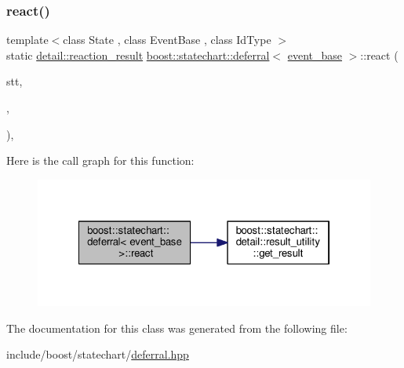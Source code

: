\subsubsection{\texorpdfstring{react()}{react()}}
{\footnotesize\ttfamily template$<$class State , class Event\+Base , class Id\+Type $>$ \\
static \mbox{\hyperlink{namespaceboost_1_1statechart_1_1detail_ab091bbb4c29327fb46ee479ea1b7255b}{detail\+::reaction\+\_\+result}} \mbox{\hyperlink{classboost_1_1statechart_1_1deferral}{boost\+::statechart\+::deferral}}$<$ \mbox{\hyperlink{classboost_1_1statechart_1_1event__base}{event\+\_\+base}} $>$\+::react (\begin{DoxyParamCaption}\item[{State \&}]{stt,  }\item[{const Event\+Base \&}]{,  }\item[{const Id\+Type \&}]{ }\end{DoxyParamCaption})\hspace{0.3cm}{\ttfamily [inline]}, {\ttfamily [static]}}

Here is the call graph for this function\+:
\nopagebreak
\begin{figure}[H]
\begin{center}
\leavevmode
\includegraphics[width=322pt]{classboost_1_1statechart_1_1deferral_3_01event__base_01_4_abce5ad466565afb17f0a210b651635bf_cgraph}
\end{center}
\end{figure}


The documentation for this class was generated from the following file\+:\begin{DoxyCompactItemize}
\item 
include/boost/statechart/\mbox{\hyperlink{deferral_8hpp}{deferral.\+hpp}}\end{DoxyCompactItemize}
